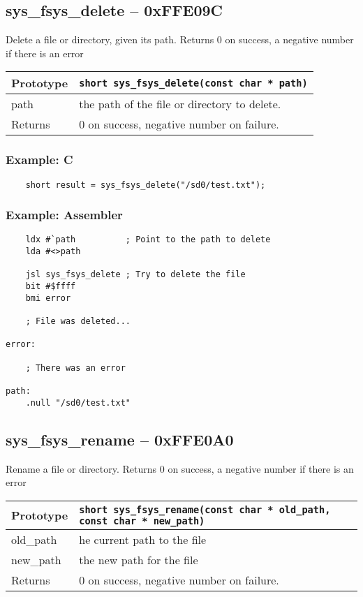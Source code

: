 \subsection*{sys\_fsys\_delete -- 0xFFE09C}
Delete a file or directory, given its path. Returns 0 on success, a negative number if there is an error

\bigskip

\begin{tabular}{|l||l|} \hline
Prototype & \lstinline!short sys_fsys_delete(const char * path)! \\ \hline
path & the path of the file or directory to delete. \\ \hline
Returns & 0 on success, negative number on failure. \\ \hline
\end{tabular}

\subsubsection*{Example: C}
\begin{lstlisting}
    short result = sys_fsys_delete("/sd0/test.txt");
\end{lstlisting}

\subsubsection*{Example: Assembler}
\begin{verbatim}
    ldx #`path          ; Point to the path to delete
    lda #<>path

    jsl sys_fsys_delete ; Try to delete the file
    bit #$ffff
    bmi error

    ; File was deleted...

error:

    ; There was an error

path:
    .null "/sd0/test.txt"
\end{verbatim}


\subsection*{sys\_fsys\_rename -- 0xFFE0A0}
Rename a file or directory. Returns 0 on success, a negative number if there is an error

\bigskip

\begin{tabular}{|l||l|} \hline
Prototype & \lstinline!short sys_fsys_rename(const char * old_path, const char * new_path)! \\ \hline
old\_path & he current path to the file \\ \hline
new\_path & the new path for the file \\ \hline
Returns & 0 on success, negative number on failure. \\ \hline
\end{tabular}

